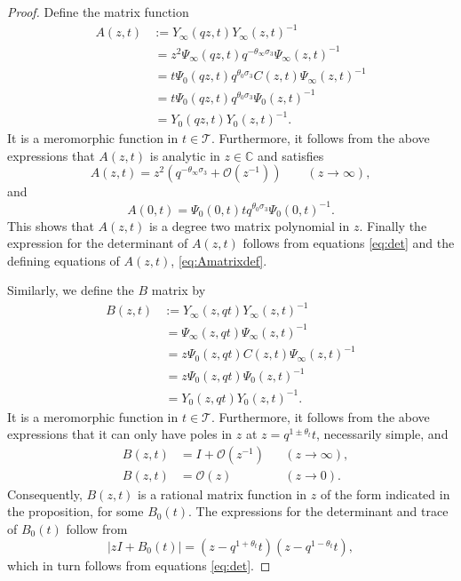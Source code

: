 \documentclass[a4paper,reqno,11pt]{amsart}
\numberwithin{equation}{section}
\numberwithin{figure}{section}
\theoremstyle{plain}
\theoremstyle{remark}
\numberwithin{rhp}{section}
\begin{document}
\begin{proof}
Define the matrix function
\begin{align}
 A(z,t)&:=Y_\infty(qz,t)Y_\infty(z,t)^{-1}\nonumber\\
 &\,=  z^2 \Psi_\infty(qz,t)q^{-\theta_\infty\sigma_3}\Psi_\infty(z,t)^{-1} \label{eq:Amatrixdef}\\
 &\,= t\Psi_0(qz,t)q^{\theta_0\sigma_3}C(z,t)\Psi_\infty(z,t)^{-1}\nonumber\\
 &\,= t\Psi_0(qz,t)q^{\theta_0\sigma_3}\Psi_0(z,t)^{-1}\nonumber\\
 &\,=Y_0(qz,t)Y_0(z,t)^{-1}.\nonumber
\end{align}
It is a meromorphic function in $t\in \mathcal{T}$. Furthermore, it follows from the above expressions that $A(z,t)$ is analytic in $z\in \mathbb{C}$ and satisfies 
\begin{equation*}
    A(z,t)=z^2(q^{-\theta_\infty\sigma_3}+\mathcal{O}(z^{-1}))\qquad (z\rightarrow \infty),
\end{equation*}
and
\begin{equation*}
A(0,t)=\Psi_0(0,t)tq^{\theta_0\sigma_3}\Psi_0(0,t)^{-1}.
\end{equation*}
This shows that $A(z,t)$ is a degree two matrix polynomial in $z$. Finally the expression for the determinant of $A(z,t)$ follows from equations \eqref{eq:det} and the defining equations of $A(z,t)$,  \eqref{eq:Amatrixdef}.

Similarly, we define the $B$ matrix by
\begin{align*}
 B(z,t)&:=Y_\infty(z,qt)Y_\infty(z,t)^{-1}\\
 &\,=\Psi_\infty(z,qt)\Psi_\infty(z,t)^{-1}\\
 &\,=z\Psi_0(z,qt)C(z,t)\Psi_\infty(z,t)^{-1}\\
 &\,=z\Psi_0(z,qt)\Psi_0(z,t)^{-1}\\
 &\,=Y_0(z,qt)Y_0(z,t)^{-1}.
\end{align*}
It is a meromorphic function in $t\in \mathcal{T}$. Furthermore, it follows from the above expressions that it can only have poles in $z$ at $z=q^{1\pm \theta_t}t$, necessarily simple, and
\begin{align*}
 & &  B(z,t)&=I+\mathcal{O}(z^{-1}) &  &(z\rightarrow \infty), &\\
&  &  B(z,t)&=\mathcal{O}(z) & &(z\rightarrow 0). &
\end{align*}
Consequently, $B(z,t)$ is a rational matrix function in $z$ of the form indicated in the proposition, for some $B_0(t)$. The expressions for the determinant and trace of $B_0(t)$ follow from
\begin{equation*}
|zI+B_0(t)|= (z-q^{1+\theta_t}t)(z-q^{1-\theta_t}t),
\end{equation*}
which in turn follows from equations \eqref{eq:det}.
\end{proof}
\end{document}
